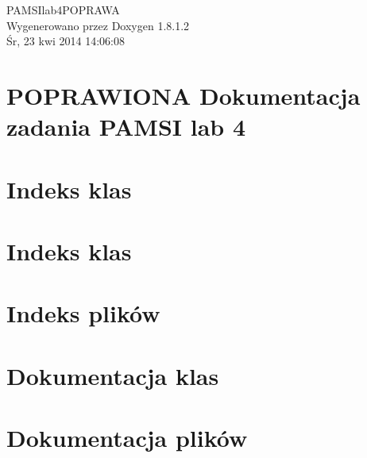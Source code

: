 \documentclass{book}
\begin{document}
\hypersetup{pageanchor=false,citecolor=blue}
\begin{titlepage}
\vspace*{7cm}
\begin{center}
{\Large P\-A\-M\-S\-Ilab4\-P\-O\-P\-R\-A\-W\-A }\\
\vspace*{1cm}
{\large Wygenerowano przez Doxygen 1.8.1.2}\\
\vspace*{0.5cm}
{\small Śr, 23 kwi 2014 14:06:08}\\
\end{center}
\end{titlepage}
\clearemptydoublepage
{}
\tableofcontents
\clearemptydoublepage
{}
\hypersetup{pageanchor=true,citecolor=blue}
\chapter{P\-O\-P\-R\-A\-W\-I\-O\-N\-A Dokumentacja zadania P\-A\-M\-S\-I lab 4}
\label{index}\hypertarget{index}{}
\chapter{Indeks klas}

\chapter{Indeks klas}

\chapter{Indeks plików}

\chapter{Dokumentacja klas}






\chapter{Dokumentacja plików}











\printindex
\end{document}
